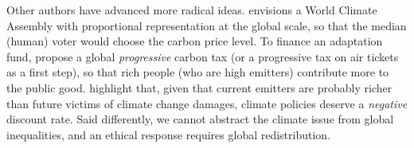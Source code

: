 Other authors have advanced more radical ideas. \citet{weitzman_world_2017} envisions a World Climate Assembly with proportional representation at the global scale, so that the median (human) voter would choose the carbon price level. %
To finance an adaptation fund, \citet{chancel_carbon_2015} propose a global \textit{progressive} carbon tax (or a progressive tax on air tickets as a first step), so that rich people (who are high emitters) contribute more to the public good. 
\citet{fleurbaey_climate_2013} highlight that, given that current emitters are probably richer than future victims of climate change damages, climate policies deserve a \textit{negative} discount rate. Said differently, we cannot abstract the climate issue from global inequalities, and an ethical response requires global redistribution. 
